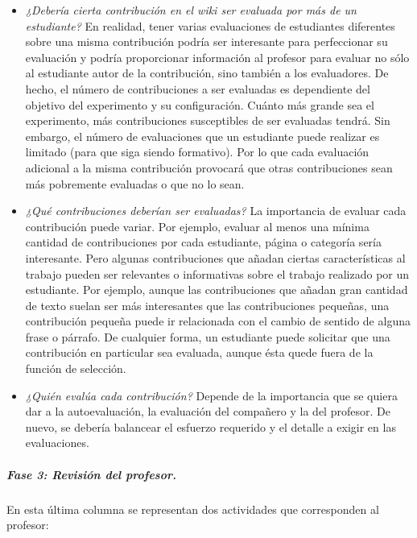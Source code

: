 			\begin{itemize}
				\item \emph{¿Debería cierta contribución en el wiki ser evaluada por más de un estudiante?} En realidad, tener varias evaluaciones de estudiantes diferentes sobre una misma contribución podría ser interesante para perfeccionar su evaluación y podría proporcionar información al profesor para evaluar no sólo al estudiante autor de la contribución, sino también a los evaluadores. De hecho, el número de contribuciones a ser evaluadas es dependiente del objetivo del experimento y su configuración. Cuánto más grande sea el experimento, más contribuciones susceptibles de ser evaluadas tendrá. Sin embargo, el número de evaluaciones que un estudiante puede realizar es limitado (para que siga siendo formativo). Por lo que cada evaluación adicional a la misma contribución provocará que otras contribuciones sean más pobremente evaluadas o que no lo sean.
				\item \emph{¿Qué contribuciones deberían ser evaluadas?} La importancia de evaluar cada contribución puede variar. Por ejemplo, evaluar al menos una mínima cantidad de contribuciones por cada estudiante, página o categoría sería interesante. Pero algunas contribuciones que añadan ciertas características al trabajo pueden ser relevantes o informativas sobre el trabajo realizado por un estudiante. Por ejemplo, aunque las contribuciones que añadan gran cantidad de texto suelan ser más interesantes que las contribuciones pequeñas, una contribución pequeña puede ir relacionada con el cambio de sentido de alguna frase o párrafo. De cualquier forma, un estudiante puede solicitar que una contribución en particular sea evaluada, aunque ésta quede fuera de la función de selección.
				\item \emph{¿Quién evalúa cada contribución?} Depende de la importancia que se quiera dar a la autoevaluación, la evaluación del compañero y la del profesor. De nuevo, se debería balancear el esfuerzo requerido y el detalle a exigir en las evaluaciones.
			\end{itemize}


			\subparagraph*{Fase 3: Revisión del profesor.}

			En esta última columna se representan dos actividades que corresponden al profesor:

